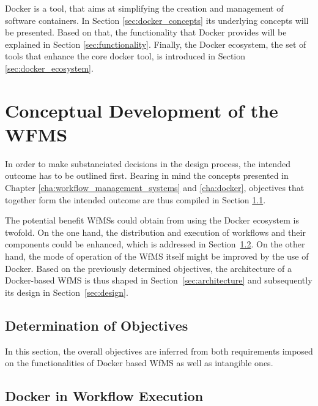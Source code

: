 \documentclass[language=english,noinputenc]{wiwwuwordrprt}
\begin{document}
    Docker is a tool, that aims at simplifying the creation and management of software containers. In Section \ref{sec:docker_concepts} its underlying concepts will be presented. Based on that, the functionality that Docker provides will be explained in Section \ref{sec:functionality}. Finally, the Docker ecosystem, \ie the set of tools that enhance the core docker tool, is introduced in Section \ref{sec:docker_ecosystem}.

    

  \chapter{Conceptual Development of the WFMS} %
    \label{cha:solution_design}

    In order to make substanciated decisions in the design process, the intended outcome has to be outlined first. Bearing in mind the concepts presented in Chapter \ref{cha:workflow_management_systems} and \ref{cha:docker}, objectives that together form the intended outcome are thus compiled in Section \ref{sec:determination_of_objectives}.

    The potential benefit \acp{WfMS} could obtain from using the Docker ecosystem is twofold.
    On the one hand, the distribution and execution of workflows and their components could be enhanced, which is addressed in Section~\ref{sec:docker_for_wf_execution}.
    On the other hand, the mode of operation of the \ac{WfMS} itself might be improved by the use of Docker.
    Based on the previously determined objectives, the architecture of a Docker-based \ac{WfMS} is thus shaped in Section~\ref{sec:architecture} and subsequently its design in Section~\ref{sec:design}.

    \section{Determination of Objectives} %
      \label{sec:determination_of_objectives}

      In this section, the overall objectives are inferred from both requirements imposed on the functionalities of Docker based \ac{WfMS} as well as intangible ones.

      

    \section{Docker in Workflow Execution} %
      \label{sec:docker_for_wf_execution}
      
\end{document}

